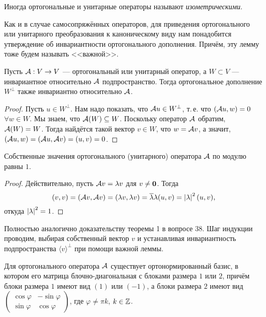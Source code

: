 Иногда ортогональные и унитарные операторы называют \textit{изометрическими}.

Как и в случае самосопряжённых операторов, для приведения ортогонального или унитарного преобразования к каноническому виду нам понадобится утверждение об инвариантности ортогонального дополнения. Причём, эту лемму тоже будем называть <<важной>>.

\begin{lemma}[Важная]
    Пусть $\mathcal{A}: V \to V$ --- ортогональный или унитарный оператор, а $W \subset V$ --- инвариантное относительно $\mathcal{A}$ подпространство. Тогда ортогональное дополнение $W^\perp$ также инвариантно относительно $\mathcal{A}$.
\end{lemma}

\begin{proof}
    Пусть $u \in W^\perp$. Нам надо показать, что $\mathcal{A} u \in W^\perp$, т.\,е. что $(\mathcal{A} u, w) = 0$ $\forall w \in W$. Мы знаем, что $\mathcal{A}(W) \subseteq W$. Поскольку оператор $\mathcal{A}$ обратим, $\mathcal{A}(W) = W$. Тогда найдётся такой вектор $v \in W$, что $w = \mathcal{A} v$, а значит, $(\mathcal{A} u, w) = (\mathcal{A} u, \mathcal{A} v) = (u, v) = 0$.
\end{proof}

\begin{lemma}
    Собственные значения ортогонального (унитарного) оператора $\mathcal{A}$ по модулю равны $1$.
\end{lemma}

\begin{proof}
    Действительно, пусть $\mathcal{A} v = \lambda v$ для $v \ne \boldsymbol{0}$. Тогда
    \[
        (v, v) = (\mathcal{A} v, \mathcal{A} v) = (\lambda v, \lambda v) = \overline{\lambda}\lambda(u, v) = \left\lvert\lambda\right\rvert^2(u, v),
    \]
    откуда $\left\lvert\lambda\right\rvert^2 = 1$.
\end{proof}

\begin{theorem}
    Полностью аналогично доказательству теоремы 1 в вопросе 38. Шаг индукции проводим, выбирая собственный вектор $v$ и устанавливая инвариантность подпространства $\langle v\rangle^\perp$ при помощи важной леммы.
\end{theorem}

\begin{theorem}
    Для ортогонального оператора $\mathcal{A}$ существует ортонормированный базис, в котором его матрица блочно-диагональная с блоками размера $1$ или $2$, причём блоки размера $1$ имеют вид $(1)$ или $(-1)$, а блоки размера $2$ имеют вид
    $
    \begin{pmatrix}
        \cos\varphi & -\sin\varphi\\
        \sin\varphi & \cos\varphi
    \end{pmatrix}
    $, где $\varphi \ne \pi k$, $k \in \mathbb{Z}$.
\end{theorem}

